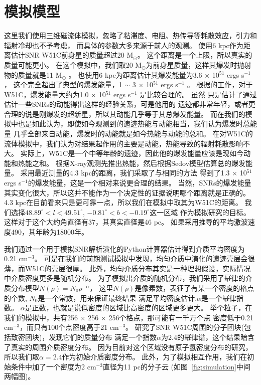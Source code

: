 \section{模拟模型}
\label{W51Cmod}
这里我们使用三维磁流体模拟，忽略了粘滞度、电阻、热传导等耗散效应，引力和辐射冷却也不予考虑，
而具体的参数大多来源于前人的观测。
\citet{Sasaki2014}使用6 kpc作为距离估计SNR W51C前身星的质量超过20 M$_\odot$。
这个距离是一个上限，所以真实的质量可能更小。
在这个模拟中，我们取20 M$_\odot$为前身星质量，这样其爆发时抛射物的质量就是11 M$_\odot$
\citep{Sukhbold2016}。
\citet{Koo1995}也使用6 kpc为距离估计其爆发能量为3.6 $\times$ 10$^{51}$ ergs s$^{-1}$，
这个完全超出了典型的爆发能量，1 $\sim$ 3 $\times$ 10$^{51}$ ergs s$^{-1}$ \citep{Poznanski2013}。
根据\citet{Poznanski2013}的工作，对于W51C，爆发能量大约为1.0 $\times$ 10$^{51}$ ergs s$^{-1}$
是比较合理的。
虽然 \citet{Poznanski2013}只是估计了通过估计一些SNRs的动能得出这样的经验关系，可是他用的
遗迹都非常年轻，或者更合理的说是刚爆发的超新星，所以其动能几乎等于其总爆发能量。
而在我们的模拟中也是如此认为，即使如今观测到的遗迹热能与动能相当，我们认为爆发时总能量
几乎全部来自动能，爆发时的动能就是如今热能与动能的总和。
在对W51C的流体模拟中，我们认为对结果起作用的主要是动能，热能导致的辐射耗散影响不大。
实际上，W51C是一个中等年龄的遗迹，因此他的爆发能量应该是现如今动能和热能之和。
\citet{Koo1995}根据X-ray观测先推出热能，然后根据Sedov模型估算总的爆发能量\citep{1959sdmm.book.....S}。
采用最近测量的4.3 kpc的距离\citep{Tian2013}，我们采取了与\citet{Koo1995}相同的方法
得到了1.3 $\times$ 10$^{51}$ ergs s$^{-1}$的爆发能量，这是一个相对来说更合理的结果。
当然，SNRs的爆发能量其实变化很大，所以这并不能作为一个决定性的证据说明哪个距离就是正确的。
4.3 kpc在目前看来只是更可靠一点，所以我们在模拟中取其为W51C的距离。
我们选择$48.89^{\circ}<l<49.51^{\circ}$, $-0.81^{\circ}<b<-0.19^{\circ}$这一区域
作为模拟研究的目标。
这样对于这个大约角直径有37，其真实直径是46 pc。
如果采用\citet{Koo1995}推导的平均激波速度490\kms，其年龄为18000年。

我们通过一个用于模拟SNR解析演化的Python计算器\citep{Leahy2017a}估计得到介质平均密度为
0.21 cm$^{-3}$。
可是在我们的前期测试模拟中发现，均匀介质中演化的遗迹壳层会很薄，而W51C的壳层很厚。
此外，均匀介质分布其实是一种理想假设，实际情况中介质密度更多是随机分布。
为了模拟出介质的随机分布，我们采用了幂律的介质分布模型$N(\rho) = N_0 \rho^{-\alpha}$，
这里$N(\rho)$是像素数，表征了有某一个密度的格点的个数, $N_0$是一个常数，用来保证最终结果
满足平均密度估计,$\alpha$是一个幂律指数。
$\alpha$是正数，也就是说低密度的区域比高密度的区域更多更大。
举个粒子，在我们的模拟中，共有256 $\times$ 256 $\times$ 256个格点，那可能有一千万个点
密度低于0.21 cm$^{-3}$，而只有100个点密度高于21 cm$^{-3}$。
\citet{Parsons2012} 研究了SNR W51C周围的分子团块(包括致密团块)，发现它们的质量分布
满足一个指数$\alpha$为2.4的幂律谱，这个结果暗含了真实的周围介质密度分布。
因为目前对这个区域没有原子氢密度分布的研究，所以我们取$\alpha=2.4$作为初始介质密度分布。
此外，为了模拟相互作用，我们在初始条件中加了一个密度为2 cm$^{-3}$直径为11 pc的分子云
(如图~\ref{fig:simulation}中间两幅图)。

